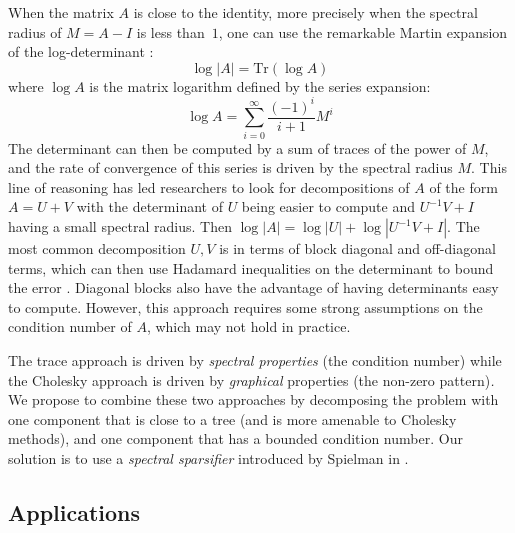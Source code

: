 When the matrix $A$ is close to the identity, more precisely when
the spectral radius of $M=A-I$ is less than~$1$, one can use the
remarkable Martin expansion of the log-determinant \cite{martin1992approximations}:
\begin{equation}
\log\left|A\right|=\text{Tr}\left(\log A\right)\label{eq:martin-expansion}
\end{equation}
where $\log A$ is the matrix logarithm defined by the series expansion:
\begin{equation}
\log A=\sum_{i=0}^{\infty}\frac{\left(-1\right)^{i}}{i+1}M^{i}\label{eq:matrix-log}
\end{equation}
The determinant can then be computed by a sum of traces of the power
of $M$, and the rate of convergence of this series is driven by the
spectral radius $M$. This line of reasoning has led researchers to
look for decompositions of $A$ of the form $A=U+V$ with the determinant
of $U$ being easier to compute and $U^{-1}V+I$ having a small spectral
radius. Then $\log\left|A\right|=\log\left|U\right|+\log\left|U^{-1}V+I\right|$.
The most common decomposition $U,V$ is in terms of block diagonal
and off-diagonal terms, which can then use Hadamard inequalities on
the determinant to bound the error \cite{Ipsen2006}. Diagonal blocks
also have the advantage of having determinants easy to compute. However,
this approach requires some strong assumptions on the condition number
of $A$, which may not hold in practice.

The trace approach is driven by \emph{spectral properties }(the condition
number) while the Cholesky approach is driven by \emph{graphical }properties\emph{
}(the non-zero pattern)\emph{. }We\emph{ }propose to combine these
two approaches by decomposing the problem with one component that
is close to a tree (and is more amenable to Cholesky methods), and
one component that has a bounded condition number. Our solution is
to use a \emph{spectral sparsifier} introduced by Spielman in \cite{Spielman2008}.


\subsection{Applications}

